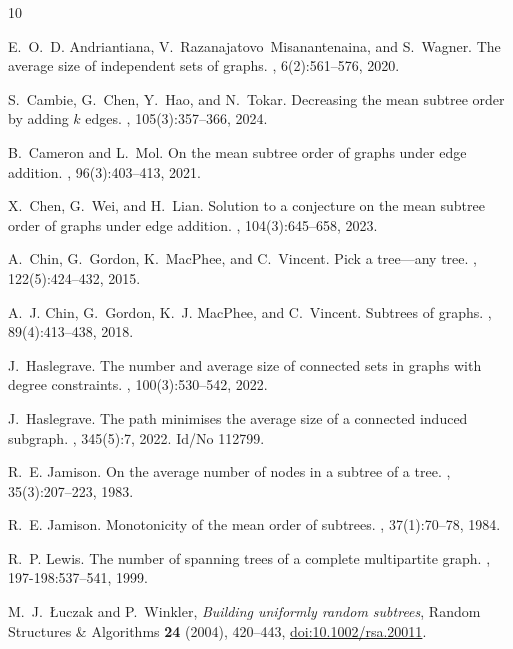 \documentclass[11pt]{article}
\theoremstyle{definition}
\begin{document}
\begin{thebibliography}{10}

E.~O.~D. Andriantiana, V.~Razanajatovo~Misanantenaina, and S.~Wagner.
\newblock The average size of independent sets of graphs.
, 6(2):561--576, 2020.

S.~Cambie, G.~Chen, Y.~Hao, and N.~Tokar.
\newblock Decreasing the mean subtree order by adding {$k$} edges.
, 105(3):357--366, 2024.

B.~Cameron and L.~Mol.
\newblock On the mean subtree order of graphs under edge addition.
, 96(3):403--413, 2021.

X.~Chen, G.~Wei, and H.~Lian.
\newblock Solution to a conjecture on the mean subtree order of graphs under
  edge addition.
, 104(3):645--658, 2023.

A.~Chin, G.~Gordon, K.~MacPhee, and C.~Vincent.
\newblock Pick a tree---any tree.
, 122(5):424--432, 2015.

A.~J. Chin, G.~Gordon, K.~J. MacPhee, and C.~Vincent.
\newblock Subtrees of graphs.
, 89(4):413--438, 2018.

J.~Haslegrave.
\newblock The number and average size of connected sets in graphs with degree
  constraints.
, 100(3):530--542, 2022.

J.~Haslegrave.
\newblock The path minimises the average size of a connected induced subgraph.
, 345(5):7, 2022.
\newblock Id/No 112799.

R.~E. Jamison.
\newblock On the average number of nodes in a subtree of a tree.
, 35(3):207--223, 1983.

R.~E. Jamison.
\newblock Monotonicity of the mean order of subtrees.
, 37(1):70--78, 1984.

R.~P. Lewis.
\newblock The number of spanning trees of a complete multipartite graph.
, 197-198:537--541, 1999.

M.~J.~{{\L}uczak} and P.~Winkler,
\emph{Building uniformly random subtrees},
Random Structures \& Algorithms \textbf{24} (2004), 420--443,
\href{https://doi.org/10.1002/rsa.20011}{doi:10.1002/rsa.20011}.



\end{thebibliography}
\end{document}
